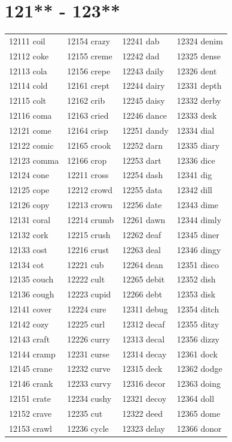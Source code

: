 \documentclass[10pt, oneside]{book}
\begin{document}
\begin{table}
	\centering
	\section*{121** - 123**}
	\begin{tabular}{l l l l}
12111 coil &12154 crazy &12241 dab &12324 denim\\
12112 coke &12155 creme &12242 dad &12325 dense\\
12113 cola &12156 crepe &12243 daily &12326 dent\\
12114 cold &12161 crept &12244 dairy &12331 depth\\
12115 colt &12162 crib &12245 daisy &12332 derby\\
12116 coma &12163 cried &12246 dance &12333 desk\\
12121 come &12164 crisp &12251 dandy &12334 dial\\
12122 comic &12165 crook &12252 darn &12335 diary\\
12123 comma &12166 crop &12253 dart &12336 dice\\
12124 cone &12211 cross &12254 dash &12341 dig\\
12125 cope &12212 crowd &12255 data &12342 dill\\
12126 copy &12213 crown &12256 date &12343 dime\\
12131 coral &12214 crumb &12261 dawn &12344 dimly\\
12132 cork &12215 crush &12262 deaf &12345 diner\\
12133 cost &12216 crust &12263 deal &12346 dingy\\
12134 cot &12221 cub &12264 dean &12351 disco\\
12135 couch &12222 cult &12265 debit &12352 dish\\
12136 cough &12223 cupid &12266 debt &12353 disk\\
12141 cover &12224 cure &12311 debug &12354 ditch\\
12142 cozy &12225 curl &12312 decaf &12355 ditzy\\
12143 craft &12226 curry &12313 decal &12356 dizzy\\
12144 cramp &12231 curse &12314 decay &12361 dock\\
12145 crane &12232 curve &12315 deck &12362 dodge\\
12146 crank &12233 curvy &12316 decor &12363 doing\\
12151 crate &12234 cushy &12321 decoy &12364 doll\\
12152 crave &12235 cut &12322 deed &12365 dome\\
12153 crawl &12236 cycle &12323 delay &12366 donor\\
	\end{tabular}
 \end{table}
\clearpage
\end{document}
